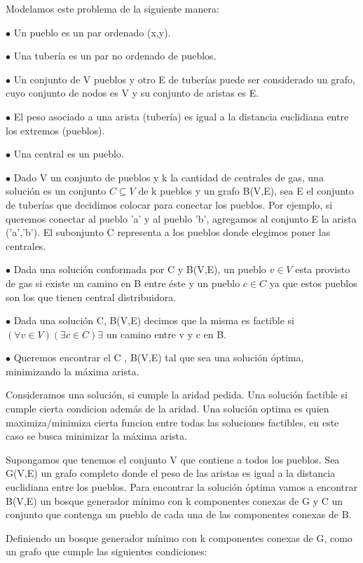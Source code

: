 Modelamos este problema de la siguiente manera:

$\bullet$ Un pueblo es un par ordenado (x,y).

$\bullet$ Una tubería es un par no ordenado de pueblos.

$\bullet$ Un conjunto de V pueblos y otro E de tuberías puede ser considerado un grafo, cuyo conjunto de nodos es V y su conjunto de aristas es E.

$\bullet$ El peso asociado a una arista (tubería) es igual a la distancia euclidiana entre los extremos (pueblos).

$\bullet$ Una central es un pueblo.

$\bullet$ Dado V un conjunto de pueblos y k la cantidad de centrales de gas, una solución es un conjunto $C \subseteq V$ de k pueblos y un grafo B(V,E), sea E el conjunto de tuberías que decidimos colocar para conectar los pueblos. Por ejemplo, si queremos conectar al pueblo 'a' y al pueblo 'b', agregamos al conjunto E la arista ('a','b'). El subonjunto C representa a los pueblos donde elegimos poner las centrales.  

$\bullet$ Dada una solución conformada por C y B(V,E), un pueblo $v \in V$ esta provisto de gas si existe un camino en B entre éste y un pueblo $c \in C$ ya que estos pueblos son los que tienen central distribuidora.

$\bullet$ Dada una solución C, B(V,E) decimos que la misma es factible si $(\forall v \in V)(\exists c \in C) \exists$ un camino entre v y c en B. 

$\bullet$ Queremos encontrar el C , B(V,E) tal que sea una solución óptima, minimizando la máxima arista.

Consideramos una solución, si cumple la aridad pedida. Una solución factible si cumple cierta condicion además de la aridad. Una solución optima es quien maximiza/minimiza cierta funcion entre todas las soluciones factibles, en este caso se busca minimizar la máxima arista.

Supongamos que tenemos el conjunto V que contiene a todos los pueblos. Sea G(V,E) un grafo completo donde el peso de las aristas es igual a la distancia euclidiana entre los pueblos. Para encontrar la solución óptima vamos a encontrar B(V,E) un bosque generador mínimo con k componentes conexas de G y C un conjunto que  contenga un pueblo de cada una de las componentes conexas de B.

Definiendo un bosque generador mínimo con k componentes conexas de G, como un grafo que cumple las siguientes condiciones:

